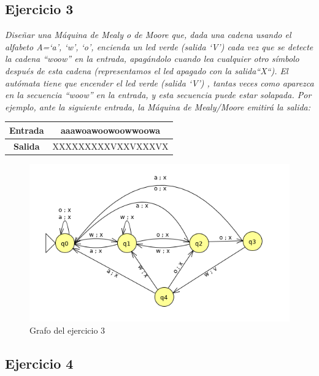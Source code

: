 \newpage

\subsection{Ejercicio 3}

\textit{Diseñar una Máquina de Mealy o de Moore que, dada una cadena usando el alfabeto A={‘a’, ‘w’, ‘o’}, encienda un led verde (salida ‘V’) cada vez que se detecte la cadena “woow” en la entrada, apagándolo cuando lea cualquier otro símbolo después de esta cadena (representamos el led apagado con la salida“X“). El autómata tiene que encender el led verde (salida ‘V’) , tantas
veces como aparezca en la secuencia “woow” en la entrada, y esta secuencia puede estar solapada. Por ejemplo, ante la siguiente entrada, la Máquina de Mealy/Moore emitirá la salida:}

\begin{table}[H]
	\centering
	\begin{tabular}[scale 0.3]{|c|c|}
		\hline
		\textbf{Entrada} & aaawoawoowoowwoowa \\
		\hline
		\textbf{Salida} & XXXXXXXXXVXXVXXXVX \\
		\hline
	\end{tabular}  
\end{table}

\begin{figure}[H]
	\centering
	\includegraphics[width=1\linewidth]{image/ejercicio7}
	\caption[prac 2 - ejer 2C]{Grafo del ejercicio 3}
	\label{fig:ejercicio3}
\end{figure}

\newpage

\subsection{Ejercicio 4}

